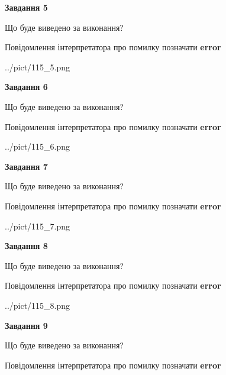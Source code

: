 \documentclass[11pt, ukrainian]{article}
\begin{document}
{\begin {large}
{\begin {center}\textbf{Завдання 5}\end {center}}\par
Що буде виведено за виконання? \par
Повідомлення інтерпретатора про помилку позначати \textbf{error}

\begin{center}
	{../pict/115_5.png}
\end{center}
\newpage

{\begin {center}\textbf{Завдання 6}\end {center}}\par
Що буде виведено за виконання? \par
Повідомлення інтерпретатора про помилку позначати \textbf{error}

\begin{center}
	{../pict/115_6.png}
\end{center}
\newpage

{\begin {center}\textbf{Завдання 7}\end {center}}\par
Що буде виведено за виконання? \par
Повідомлення інтерпретатора про помилку позначати \textbf{error}

\begin{center}
	{../pict/115_7.png}
\end{center}
\newpage

{\begin {center}\textbf{Завдання 8}\end {center}}\par
Що буде виведено за виконання? \par
Повідомлення інтерпретатора про помилку позначати \textbf{error}

\begin{center}
	{../pict/115_8.png}
\end{center}
\newpage

{\begin {center}\textbf{Завдання 9}\end {center}}\par
Що буде виведено за виконання? \par
Повідомлення інтерпретатора про помилку позначати \textbf{error}


\end{large}}
\end{document}

